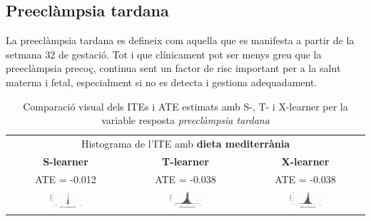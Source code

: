 \documentclass[../main.tex]{subfiles}
\begin{document}
    
    \subsection{Preeclàmpsia tardana}\label{subsec:PElate}

    La preeclàmpsia tardana es defineix com aquella que es manifesta a partir de la setmana 32 de gestació. Tot i que clínicament pot ser menys greu que la preeclàmpsia precoç, continua sent un factor de risc important per a la salut materna i fetal, especialment si no es detecta i gestiona adequadament.
    
    \begin{table}[H]
        \centering
        \begin{tabular}{ccc}
        \multicolumn{3}{c}{Histograma de l'ITE amb \textbf{dieta mediterrània}} \\
        \small \textbf{S-learner} & \small \textbf{T-learner} & \small \textbf{X-learner} \\
        \footnotesize ATE = -0.012 & \footnotesize ATE = -0.038 & \footnotesize ATE = -0.038 \\
        \includegraphics[width=0.3\textwidth]{imgs/histogrames/hist(PElate)S_tract2.jpg} &
        \includegraphics[width=0.3\textwidth]{imgs/histogrames/hist(PElate)T_tract2.jpg} &
        \includegraphics[width=0.3\textwidth]{imgs/histogrames/hist(PElate)X_tract2.jpg} \\
        \end{tabular}
        \caption{\footnotesize Comparació visual dels ITEs i ATE estimats amb S-, T- i X-learner per la variable resposta \textit{preeclàmpsia tardana}}
        \label{tab:histITE_PElate2}
    \end{table}
\end{document}
